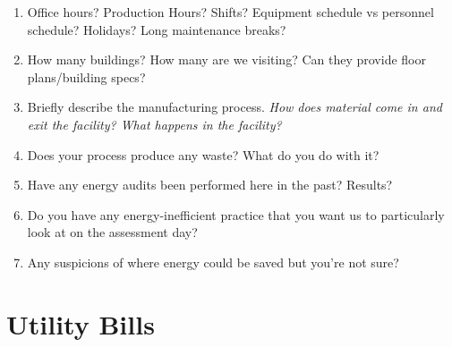 \documentclass[./main.tex]{subfiles}
\begin{document}
\begin{enumerate}[leftmargin=*]
\item Office hours? Production Hours? Shifts? Equipment schedule vs personnel schedule? Holidays? Long maintenance breaks?

\vspace{\answerspace}

\item How many buildings? How many are we visiting? Can they provide floor plans/building specs?

\vspace{\answerspace}

\item Briefly describe the manufacturing process. \emph{How does material come in and exit the facility? What happens in the facility? }

\vspace{\answerspace} \vspace{\answerspace} \vspace{\answerspace} 

\item Does your process produce any waste? What do you do with it? 

\vspace{\answerspace}

\item Have any energy audits been performed here in the past? Results?

\vspace{\answerspace}

\item Do you have any energy-inefficient practice that you want us to particularly look at on the assessment day?

\vspace{\answerspace}

\item Any suspicions of where energy could be saved but you're not sure?

\vspace{\answerspace}


\end{enumerate}

\section*{Utility Bills}
\end{document}
